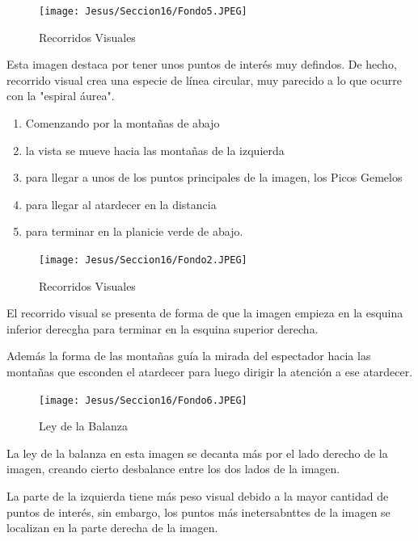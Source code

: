\documentclass[12pt]{article}
\begin{document}
          \begin{figure}[H]
            \centering
            \texttt{[image: Jesus/Seccion16/Fondo5.JPEG]}
            \caption{Recorridos Visuales}
          \end{figure}
          Esta imagen destaca por tener unos puntos de interés muy defindos. 
          De hecho, recorrido visual crea una especie de línea circular, muy parecido a lo que ocurre con la "espiral áurea". 

          \begin{enumerate}
            \item Comenzando por la montañas de abajo 
            \item la vista se mueve hacia las montañas de la izquierda
            \item para llegar a unos de los puntos principales de la imagen, los Picos Gemelos
            \item para llegar al atardecer en la distancia
            \item para terminar en la planicie verde de abajo.
          \end{enumerate}

          \begin{figure}[H]
            \centering
            \texttt{[image: Jesus/Seccion16/Fondo2.JPEG]}
            \caption{Recorridos Visuales}
          \end{figure}
	          El recorrido visual se presenta de forma de que la imagen empieza en la esquina inferior derecgha para terminar en la esquina superior derecha.

            Además la forma de las montañas guía la mirada del espectador hacia las montañas que esconden el atardecer para luego dirigir la atención a ese atardecer. 
          
          \begin{figure}[H]
            \centering
            \texttt{[image: Jesus/Seccion16/Fondo6.JPEG]}
            \caption{Ley de la Balanza}
          \end{figure}
            La ley de la balanza en esta imagen se decanta más por el lado derecho de la imagen, creando cierto desbalance entre los dos lados de la imagen. 
            
            La parte de la izquierda tiene más peso visual debido a la mayor cantidad de puntos de interés, sin embargo, los puntos más inetersabnttes de la imagen se localizan en la parte derecha de la imagen. 
      
\end{document}
